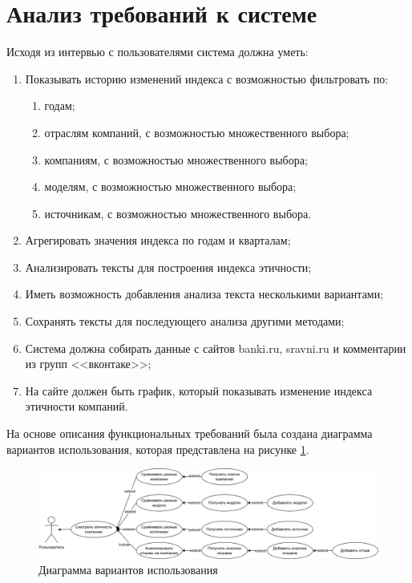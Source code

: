 \documentclass[PI, VKR]{HSEUniversity}
\begin{document}
\section{Анализ требований к системе}
\label{sec:orgee5a243}
Исходя из интервью с пользователями система должна уметь:
\begin{enumerate}
\item Показывать историю изменений индекса с возможностью фильтровать по:
\begin{enumerate}
\item годам;
\item отраслям компаний, с возможностью множественного выбора;
\item компаниям, с возможностью множественного выбора;
\item моделям, с возможностью множественного выбора;
\item источникам, с возможностью множественного выбора.
\end{enumerate}
\item Агрегировать значения индекса по годам и кварталам;
\item Анализировать тексты для построения индекса этичности;
\item Иметь возможность добавления анализа текста несколькими вариантами;
\item Сохранять тексты для последующего анализа другими методами;
\item Система должна собирать данные с сайтов banki.ru, sravni.ru и комментарии из групп {}<<вконтаке>>{};
\item На сайте должен быть график, который показывать изменение индекса этичности компаний.
\end{enumerate}

На основе описания функциональных требований была создана диаграмма вариантов использования, которая представлена на рисунке \ref{fig:usecasefull}.
\begin{figure}[h!]
\centering
\includegraphics[width=\textwidth]{img/use-case.png}
\caption{\label{fig:usecasefull}Диаграмма вариантов использования}
\end{figure}
\end{document}
